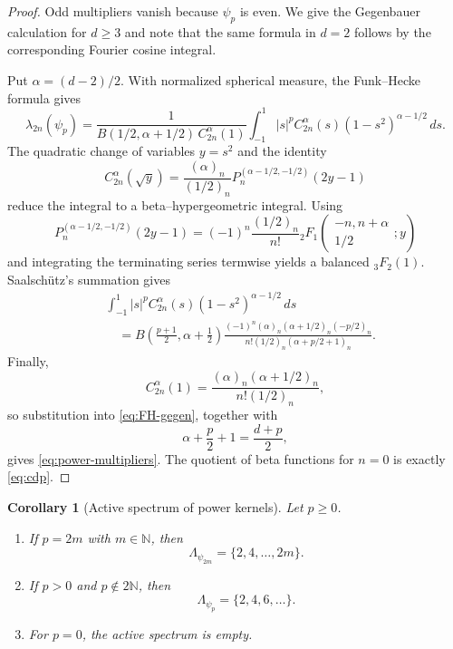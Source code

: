 \documentclass[12pt,a4paper]{article}
\newcommand{\N}{\mathbb N}
\theoremstyle{plain}
\newtheorem{corollary}[theorem]{Corollary}
\theoremstyle{definition}
\begin{document}
\begin{proof}
Odd multipliers vanish because $\psi_p$ is even.  We give the Gegenbauer calculation for $d\ge3$ and note that the same formula in $d=2$ follows by the corresponding Fourier cosine integral.

Put $\alpha=(d-2)/2$.  With normalized spherical measure, the Funk--Hecke formula gives
\begin{equation}\label{eq:FH-gegen}
 \lambda_{2n}(\psi_p)
 =\frac{1}{B(1/2,\alpha+1/2)\,C_{2n}^{\alpha}(1)}
 \int_{-1}^1|s|^pC_{2n}^{\alpha}(s)(1-s^2)^{\alpha-1/2}\,ds.
\end{equation}
The quadratic change of variables $y=s^2$ and the identity
\begin{equation}\label{eq:gegen-jacobi}
 C_{2n}^{\alpha}(\sqrt y)
 =\frac{(\alpha)_n}{(1/2)_n}
 P_n^{(\alpha-1/2,-1/2)}(2y-1)
\end{equation}
reduce the integral to a beta--hypergeometric integral.  Using
\[
 P_n^{(\alpha-1/2,-1/2)}(2y-1)
 =(-1)^n\frac{(1/2)_n}{n!}
 {}_2F_1\!\left(\begin{matrix}-n,n+\alpha\\[1mm]1/2\end{matrix};y\right)
\]
and integrating the terminating series termwise yields a balanced ${}_3F_2(1)$.  Saalsch\"utz's summation gives
\begin{align}\label{eq:gegen-integral}
 &\int_{-1}^1|s|^pC_{2n}^{\alpha}(s)(1-s^2)^{\alpha-1/2}\,ds\\
 &\quad=
 B\!\left(\frac{p+1}{2},\alpha+\frac12\right)
 \frac{(-1)^n(\alpha)_n(\alpha+1/2)_n(-p/2)_n}
 {n!(1/2)_n(\alpha+p/2+1)_n}.
\end{align}
Finally,
\[
 C_{2n}^{\alpha}(1)
 =\frac{(\alpha)_n(\alpha+1/2)_n}{n!(1/2)_n},
\]
so substitution into \eqref{eq:FH-gegen}, together with
\[
 \alpha+\frac p2+1=\frac{d+p}{2},
\]
gives \eqref{eq:power-multipliers}.  The quotient of beta functions for $n=0$ is exactly \eqref{eq:cdp}.
\end{proof}

\begin{corollary}[Active spectrum of power kernels]\label{cor:power-spectrum}
Let $p\ge0$.
\begin{enumerate}
\item If $p=2m$ with $m\in\N$, then
\begin{equation}\label{eq:active-even-power}
 \Lambda_{\psi_{2m}}=\{2,4,\ldots,2m\}.
\end{equation}
\item If $p>0$ and $p\notin2\N$, then
\begin{equation}\label{eq:active-noneven-power}
 \Lambda_{\psi_p}=\{2,4,6,\ldots\}.
\end{equation}
\item For $p=0$, the active spectrum is empty.
\end{enumerate}
\end{corollary}
\end{document}
